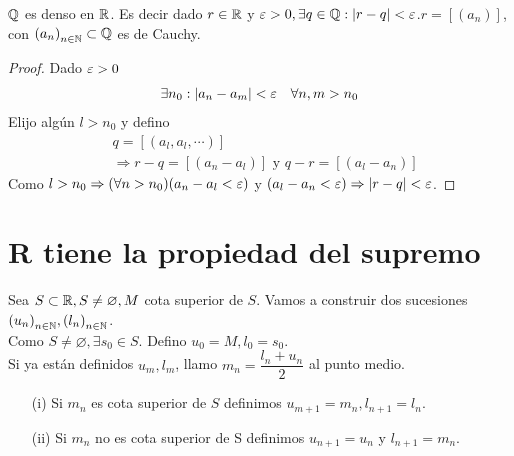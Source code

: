 \begin{theorem}
	\(\mathbb{Q} \) es denso en \(\mathbb{R} \). Es decir dado \(r \in \mathbb{R} \) y \(\varepsilon > 0, \exists q \in \mathbb{Q} : |r-q| < \varepsilon \).\(r = [(a_n)]\), con \({(a_n)}_{n \in \mathbb{N}} \subset \mathbb{Q} \) es de Cauchy.

	\begin{proof}
		Dado \( \varepsilon > 0 \)\begin{align*}
			\exists n_0 : |a_n - a_m| < \varepsilon \quad \forall n, m > n_0
		\end{align*}
		Elijo algún \( l > n_0 \) y defino \begin{align*}
			 & q = [(a_l, a_l, \cdots)]                                       \\
			 & \Rightarrow r-q = [(a_n - a_l)] \text{ y } q-r = [(a_l - a_n)]
		\end{align*}
		Como \( l > n_0 \Rightarrow (\forall n > n_0)(a_n-a_l < \varepsilon) \) y \( (a_l - a_n < \varepsilon) \Rightarrow |r-q| < \varepsilon \).
	\end{proof}
\end{theorem}

\section{R tiene la propiedad del supremo}

Sea \(S \subset \mathbb{R}, S \neq \varnothing, M\) cota superior de \(S\). Vamos a construir dos sucesiones \({(u_n)}_{n \in \mathbb{N}}, {(l_n)}_{n \in \mathbb{N}} \). \\
Como \(S \neq \varnothing, \exists s_0 \in S\). Defino \(u_0 = M, l_0 = s_0\). \\
Si ya están definidos \(u_m, l_m\), llamo \(m_n = \dfrac{l_n+u_n}{2} \) al punto medio.\begin{enumerate}
	\item[(i)] Si \(m_n\) es cota superior de \(S\) definimos \(u_{m+1} = m_n, l_{n+1} = l_n\).
	\item[(ii)] Si \(m_n\) no es cota superior de S definimos \(u_{n+1} = u_n\) y \(l_{n+1} = m_n\).
\end{enumerate}

